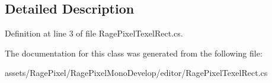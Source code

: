 \subsection{Detailed Description}


Definition at line 3 of file Rage\-Pixel\-Texel\-Rect.\-cs.



The documentation for this class was generated from the following file\-:\begin{DoxyCompactItemize}
\item 
assets/\-Rage\-Pixel/\-Rage\-Pixel\-Mono\-Develop/editor/Rage\-Pixel\-Texel\-Rect.\-cs\end{DoxyCompactItemize}
